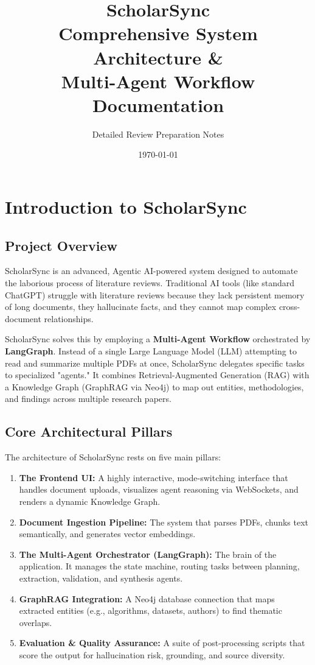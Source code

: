 \documentclass[12pt, a4paper]{report}
\title{\Huge \textbf{ScholarSync}\\ \vspace{1cm} \Large \textbf{Comprehensive System Architecture \&\\ Multi-Agent Workflow Documentation}}
\author{Detailed Review Preparation Notes}
\date{\today}
\begin{document}
\maketitle

\tableofcontents
\newpage

\chapter{Introduction to ScholarSync}

\section{Project Overview}
ScholarSync is an advanced, Agentic AI-powered system designed to automate the laborious process of literature reviews. Traditional AI tools (like standard ChatGPT) struggle with literature reviews because they lack persistent memory of long documents, they hallucinate facts, and they cannot map complex cross-document relationships. 

ScholarSync solves this by employing a \textbf{Multi-Agent Workflow} orchestrated by \textbf{LangGraph}. Instead of a single Large Language Model (LLM) attempting to read and summarize multiple PDFs at once, ScholarSync delegates specific tasks to specialized "agents." It combines Retrieval-Augmented Generation (RAG) with a Knowledge Graph (GraphRAG via Neo4j) to map out entities, methodologies, and findings across multiple research papers.

\section{Core Architectural Pillars}
The architecture of ScholarSync rests on five main pillars:
\begin{enumerate}
    \item \textbf{The Frontend UI:} A highly interactive, mode-switching interface that handles document uploads, visualizes agent reasoning via WebSockets, and renders a dynamic Knowledge Graph.
    \item \textbf{Document Ingestion Pipeline:} The system that parses PDFs, chunks text semantically, and generates vector embeddings.
    \item \textbf{The Multi-Agent Orchestrator (LangGraph):} The brain of the application. It manages the state machine, routing tasks between planning, extraction, validation, and synthesis agents.
    \item \textbf{GraphRAG Integration:} A Neo4j database connection that maps extracted entities (e.g., algorithms, datasets, authors) to find thematic overlaps.
    \item \textbf{Evaluation \& Quality Assurance:} A suite of post-processing scripts that score the output for hallucination risk, grounding, and source diversity.
\end{enumerate}
\end{document}
